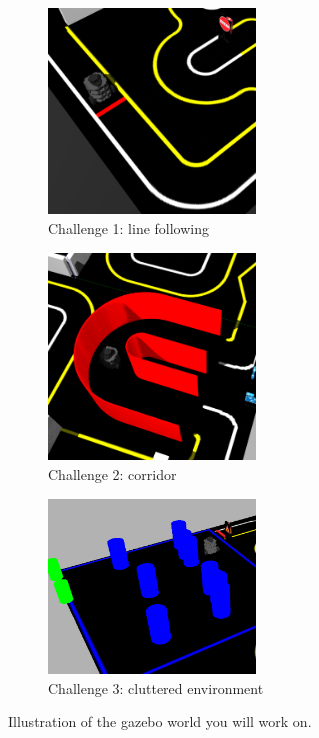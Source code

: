 \documentclass[10pt,a4paper,printanswers]{upmc}
\begin{document}
\begin{figure}[!h]
  \centering
  \begin{subfigure}[b]{0.33\textwidth}
    \centering
    \includegraphics[width=5.5cm]{figures/illustr1_autorace.png}
    \caption{Challenge 1: line following}
    \label{fig:challenge1}
  \end{subfigure}
  \begin{subfigure}[b]{0.33\textwidth}
    \centering
    \includegraphics[width=5.5cm]{figures/illustr2_autorace.png}
    \caption{Challenge 2: corridor}
    \label{fig:challenge2}
  \end{subfigure}
  \begin{subfigure}[b]{0.33\textwidth}
    \centering
    \includegraphics[width=5.5cm]{figures/illustr3_autorace_2.png}
    \caption{Challenge 3: cluttered environment}
    \label{fig:challenge3}
  \end{subfigure}
  \caption{Illustration of the gazebo world you will work on.}
  \label{fig:challenges}
\end{figure}
\end{document}

